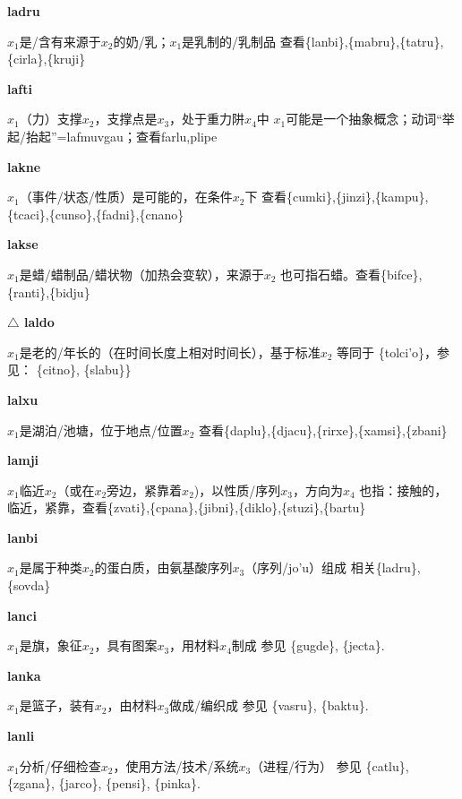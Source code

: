 \documentclass[notitlepage,twocolumn,a4paper,10pt]{book}
\begin{document}
{\sffamily\bfseries ladru}\enspace {\ttfamily\bfseries[lad]}  $x_1$是\slash{}含有来源于$x_2$的奶\slash{}乳；$x_1$是乳制的\slash{}乳制品 \textemdash{} 查看\{lanbi\},\{mabru\},\{tatru\},\{cirla\},\{kruji\}

{\sffamily\bfseries lafti}\enspace {\ttfamily\bfseries[laf]}  $x_1$（力）支撑$x_2$，支撑点是$x_3$，处于重力阱$x_4$中 \textemdash{} $x_1$可能是一个抽象概念；动词“举起\slash{}抬起”={lafmuvgau}；查看{farlu},{plipe}

{\sffamily\bfseries lakne}\enspace {\ttfamily\bfseries[        la'e]}  $x_1$（事件\slash{}状态\slash{}性质）是可能的，在条件$x_2$下 \textemdash{} 查看\{cumki\},\{jinzi\},\{kampu\},\{tcaci\},\{cunso\},\{fadni\},\{cnano\}

{\sffamily\bfseries lakse}\enspace {\ttfamily\bfseries[lak]}  $x_1$是蜡\slash{}蜡制品\slash{}蜡状物（加热会变软），来源于$x_2$ \textemdash{} 也可指石蜡。查看\{bifce\},\{ranti\},\{bidju\}

{\sffamily\bfseries $\triangle$ laldo} $x_1$是老的\slash{}年长的（在时间长度上相对时间长），基于标准$x_2$ \textemdash{} 等同于 \{tolci'o\}，参见： \{citno\}, \{slabu\}\}

{\sffamily\bfseries lalxu}\enspace {\ttfamily\bfseries[        la'u]}  $x_1$是湖泊\slash{}池塘，位于地点\slash{}位置$x_2$ \textemdash{} 查看\{daplu\},\{djacu\},\{rirxe\},\{xamsi\},\{zbani\}

{\sffamily\bfseries lamji}\enspace {\ttfamily\bfseries[lam     la'i]}  $x_1$临近$x_2$（或在$x_2$旁边，紧靠着$x_2$)，以性质\slash{}序列$x_3$，方向为$x_4$ \textemdash{} 也指：接触的，临近，紧靠，查看\{zvati\},\{cpana\},\{jibni\},\{diklo\},\{stuzi\},\{bartu\}

{\sffamily\bfseries lanbi} $x_1$是属于种类$x_2$的蛋白质，由氨基酸序列$x_3$（序列\slash{}jo'u）组成 \textemdash{} 相关\{ladru\},\{sovda\}

{\sffamily\bfseries lanci} $x_1$是旗，象征$x_2$，具有图案$x_3$，用材料$x_4$制成 \textemdash{} 参见 \{gugde\}, \{jecta\}.

{\sffamily\bfseries lanka} $x_1$是篮子，装有$x_2$，由材料$x_3$做成\slash{}编织成 \textemdash{} 参见 \{vasru\}, \{baktu\}.

{\sffamily\bfseries lanli}\enspace {\ttfamily\bfseries[lal]}  $x_1$分析\slash{}仔细检查$x_2$，使用方法\slash{}技术\slash{}系统$x_3$（进程\slash{}行为） \textemdash{} 参见 \{catlu\}, \{zgana\}, \{jarco\}, \{pensi\}, \{pinka\}.
\end{document}
